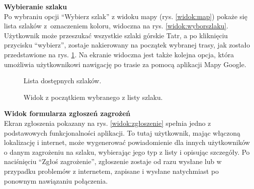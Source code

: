 \noindent
\textbf{Wybieranie szlaku} \\
\indent Po wybraniu opcji “Wybierz szlak” z widoku mapy (rys. \ref{widok:map}) pokaże się lista szlaków z~oznaczeniem koloru, widoczna na rys. \ref{widok:wyborszlaku}. Użytkownik może przeszukać wszystkie szlaki górskie Tatr, a po kliknięciu przycisku “wybierz”, zostaje nakierowany na początek wybranej trasy, jak zostało przedstawione na rys. \ref{widok:szlak}. Na ekranie widoczna jest także kolejna opcja, która umożliwia użytkownikowi nawigację po trasie za pomocą aplikacji Mapy Google.\\

\begin{figure}[H]
    \centering
    \begin{minipage}{0.3\textwidth} %
        \centering
        \caption{Lista dostępnych szlaków.}
        \label{widok:wyborszlaku}
    \end{minipage}
    \hspace{0.15\textwidth}
    \begin{minipage}{0.3\textwidth} %
        \centering
        \caption{Widok z początkiem wybranego z listy szlaku.}
        \label{widok:szlak}
    \end{minipage}
\end{figure}

\noindent
\textbf{Widok formularza zgłoszeń zagrożeń} \\
\indent Ekran zgłoszenia pokazany na rys. \ref{widok:zgłoszenie} spełnia jedno z podstawowych funkcjonalności aplikacji. To tutaj użytkownik, mając włączoną lokalizację i internet, może wygenerować powiadomienie dla innych użytkowników o danym zagrożeniu na szlaku, wybierając jego typ z listy i opisując szczegóły. Po naciśnięciu “Zgłoś zagrożenie”, zgłoszenie zostaje od razu wysłane lub w przypadku problemów z internetem, zapisane i wysłane natychmiast po ponownym nawiązaniu połączenia.

\begin{figure}[H]
    \centering
\end{figure}

